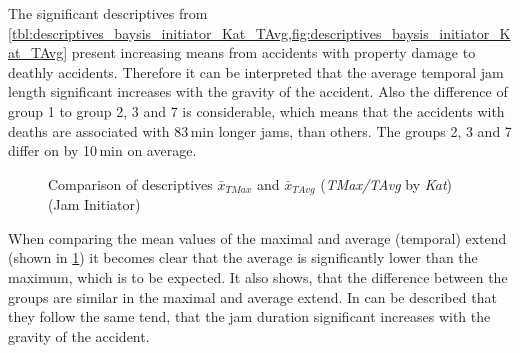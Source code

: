 The significant descriptives from \cref{tbl:descriptives_baysis_initiator_Kat_TAvg,fig:descriptives_baysis_initiator_Kat_TAvg} present increasing means from accidents with property damage to deathly accidents. Therefore it can be interpreted that the average temporal jam length significant increases with the gravity of the accident. Also the difference of group 1 to group 2, 3 and 7 is considerable, which means that the accidents with deaths are associated with 83\,min longer jams, than others. The groups 2, 3 and 7 differ on by 10\,min on average. 
\begin{figure}[ht!]
	\data
    \pgfplotstablesort[sort key=meanTAvg, sort cmp=float >]{\datasorted}{\data}
    \tiny
    \centering
	\caption{Comparison of descriptives $\bar{x}_{TMax}$ and $\bar{x}_{TAvg}$ (\textit{TMax/TAvg} by \textit{Kat}) (Jam Initiator)}
	\label{fig:baysis_initiator_meancomparison_Kat_temporal}
\end{figure}
When comparing the mean values of the maximal and average (temporal) extend (shown in \cref{fig:baysis_initiator_meancomparison_Kat_temporal}) it becomes clear that the average is significantly lower than the maximum, which is to be expected. It also shows, that the difference between the groups are similar in the maximal and average extend. In can be described that they follow the same tend, that the jam duration significant increases with the gravity of the accident.

 

